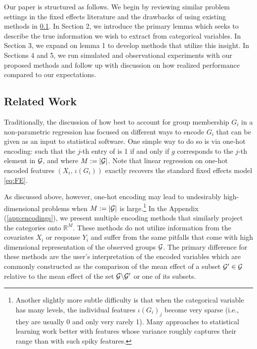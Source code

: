 \documentclass{article}
\theoremstyle{plain}
\theoremstyle{definition}
\theoremstyle{remark}
\begin{document}
Our paper is structured as follows. We begin by reviewing similar problem settings in the fixed effects literature and the drawbacks of using existing methods in \ref{subsec:related_work}. In Section 2, we introduce the primary lemma which seeks to describe the true information we wish to extract from categorical variables. In Section 3, we expand on lemma 1 to develop methods that utilize this insight. In Sections 4 and 5, we run simulated and observational experiments with our proposed methods and follow up with discussion on how realized performance compared to our expectations.

\subsection{Related Work}
\label{subsec:related_work}

Traditionally, the discussion of how best to account for group membership $G_i$ in a non-parametric regression
has focused on different ways to encode $G_i$ that can be given as an input to
statistical software. One simple way to do so is via one-hot encoding:
 such that the $j$-th entry of 
is 1 if and only if $g$ corresponds to the $j$-th element in $\mathcal{G}$, and where $M := {\left\lvert\mathcal{G}\right\rvert}$. Note that linear regression on
one-hot encoded features $(X_i, \, \iota(G_i))$ exactly recovers the standard fixed effects model
\eqref{eq:FE}.

As discussed above, however, one-hot encoding may lead to undesirably high-dimensional problems
when $M := \left\lvert\mathcal{G}\right\rvert$ is large.\footnote{Another slightly more subtle difficulty is that when the categorical
variable has many levels, the individual features $\iota(G_i)_j$ become very sparse (i.e., they are usually
0 and only very rarely 1). Many approaches to statistical learning work better with features whose
variance roughly captures their range than with such spiky features.} In the Appendix (\ref{app:encodings}),
we present multiple encoding methods that similarly project the categories onto $\mathbb{R}^{M}$.
These methods do not utilize information from the covariates $X_i$ or response $Y_i$ and suffer from the same pitfalls that
come with high dimensional representation of the observed groups $\mathcal{G}$. The primary difference for
these methods are the user's interpretation of the encoded variables which are commonly constructed as the comparison of
 the mean effect of a subset $\mathcal{G}' \in \mathcal{G}$ relative to the mean effect of the set $\mathcal{G} \backslash \mathcal{G}'$ or one of its subsets.
\end{document}
